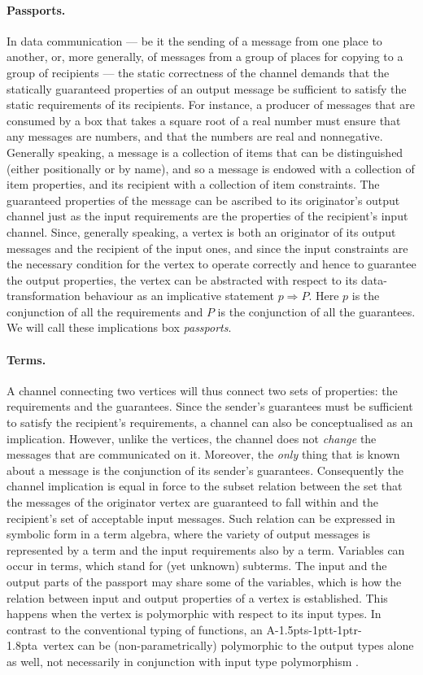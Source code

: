 \documentclass[11pt]{report}
\def\ak{{\textsf{A\kern-1.5pts\kern-1ptt\kern-1ptr\kern-1.8pta}}\kern-2pt{\it K\kern-2ptahn}}
\begin{document}
\paragraph{Passports.}In data communication --- be it the sending of a message from one place to another, or,  more generally,  of messages from a group of places for copying to a group of recipients --- the static correctness of the channel demands that the statically guaranteed properties of an output message be sufficient to satisfy the static requirements of its recipients. For instance, a producer of messages that are consumed by a box that takes a square root of a real number must ensure that any messages are numbers, and that the numbers are real and nonnegative. Generally speaking, a message is a collection of items that can be distinguished (either positionally or by name), and so a message is endowed with a collection of item properties, and its recipient with a collection of item constraints. The guaranteed properties of the message can be ascribed to its originator's output channel just as the input requirements are the properties of the recipient's input channel. Since, generally speaking, a vertex is both an originator of its output messages and the recipient of the input ones, and since the input constraints are the necessary condition for the vertex to operate correctly and hence to guarantee the output properties, the vertex can be abstracted with respect to its data-transformation behaviour as an implicative statement $p\Rightarrow P$.  Here $p$ is the conjunction of all the requirements and $P$ is the conjunction of all the guarantees. We will call these implications box {\em passports}.

\paragraph{Terms.} A channel connecting two vertices will thus connect two sets of properties: the requirements and the guarantees. Since the sender's guarantees must be sufficient to satisfy the recipient's requirements, a channel can also be conceptualised as an implication. However, unlike the vertices, the channel does not {\em change} the messages that are communicated on it. Moreover, the {\em only} thing that is known about a message is the conjunction of its sender's guarantees. Consequently the channel implication is equal in force to the subset relation between the set that the messages of the originator vertex are guaranteed to fall within and the recipient's set of acceptable input messages. Such relation can be expressed in symbolic form in a term algebra, where the variety of output messages is represented by a term and the input requirements also by a term. Variables can occur in terms, which stand for (yet unknown) subterms. The input and the output parts of the passport may share some of the variables, which is how the relation between input and output properties of a vertex is established. This happens when the vertex is polymorphic with respect to its input types. In contrast to the conventional typing of functions, an \ak\ vertex can be (non-parametrically) polymorphic to the output types alone as well, not necessarily in conjunction with input type polymorphism .
\end{document}
